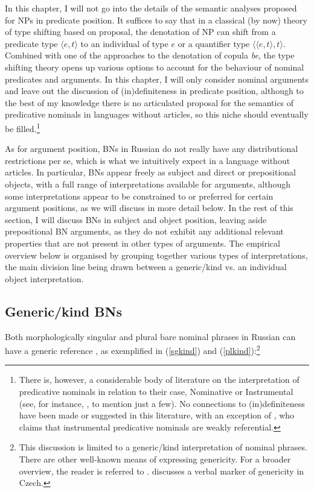 \documentclass[output=paper,colorlinks,citecolor=brown]{langscibook}
\begin{document}
\noindent In this chapter, I will not go into the details of the semantic analyses proposed for NPs in predicate position. It suffices to say that in a classical (by now) theory of type shifting based on  proposal, the denotation of NP can shift from a predicate type {$\langle e,t \rangle$} to an individual of type {$e$} or a quantifier type {$\langle \langle e,t \rangle, t \rangle$}. Combined with one of the approaches to the denotation of copula \textit{be}, the type shifting theory opens up various options to account for the behaviour of nominal predicates and arguments. In this chapter, I will only consider nominal arguments and leave out the discussion of (in)definiteness in predicate position, although to the best of my knowledge there is no articulated proposal for the semantics of predicative nominals in languages without articles, so this niche should eventually be filled.\footnote{There is, however, a considerable body of literature on the interpretation of predicative nominals in relation to their case, Nominative or Instrumental (see, for instance, \citealt{pereltsvaig01, geist08a}, to mention just a few). No connections to (in)definiteness have been made or suggested in this literature, with an exception of \citet{bogatyreva14}, who claims that instrumental predicative nominals are weakly referential.} 

As for argument position, BNs in Russian do not really have any distributional restrictions per se, which is what we intuitively expect in a language without articles. In particular, BNs appear freely as subject and direct or prepositional objects, with a full range of interpretations available for arguments, although some interpretations appear to be constrained to or preferred for certain argument positions, as we will discuss in more detail below. In the rest of this section, I will discuss BNs in subject and object position, leaving aside prepositional BN arguments, as they do not exhibit any additional relevant properties that are not present in other types of arguments. The empirical overview below is organised by grouping together various types of interpretations, the main division line being drawn between a generic/kind vs. an individual object interpretation. 

\subsection{Generic/kind BNs} \label{kinds}

Both morphologically singular and plural bare nominal phrases in Russian can have a generic reference \citep[see][]{chierchia98, doron03, dayal04}, as exemplified in (\ref{sgkind}) and (\ref{plkind}):\footnote{This discussion is limited to a generic/kind interpretation of nominal phrases. There are other well-known means of expressing genericity. For a broader overview, the reader is referred to \citet{krifkaetal}.  discusses a verbal marker of genericity in Czech.}
\end{document}
